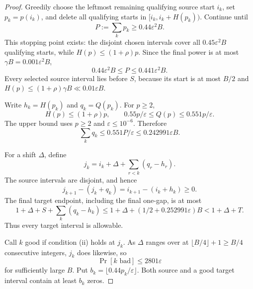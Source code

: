 \documentclass[11pt]{article}
\theoremstyle{remark}
\newcommand{\eps}{\varepsilon}
\begin{document}
\begin{proof}
Greedily choose the leftmost remaining qualifying source start $i_k$, set
$p_k=p(i_k)$, and delete all qualifying starts in
$[i_k,i_k+H(p_k))$.  Continue until
\[
 P:=\sum_kp_k\ge0.44\eps^2B.
\]
This stopping point exists: the disjoint chosen intervals cover all
$0.45\eps^2B$ qualifying starts, while
$H(p)\le(1+\rho)p$.  Since the final power is at most
$\gamma B=0.001\eps^2B$,
\begin{equation}\label{eq:P-range}
 0.44\eps^2B\le P\le0.441\eps^2B.
\end{equation}
Every selected source interval lies before $S$, because its start is at most
$B/2$ and $H(p)\le(1+\rho)\gamma B\ll0.01\eps B$.

Write $h_k=H(p_k)$ and $q_k=Q(p_k)$.  For $p\ge2$,
\begin{equation}\label{eq:Q-bound}
 H(p)\le(1+\rho)p,
 \qquad
 0.55p/\eps\le Q(p)\le0.551p/\eps.
\end{equation}
The upper bound uses $p\ge2$ and $\eps\le10^{-6}$.  Therefore
\begin{equation}\label{eq:Qsum}
 \sum_kq_k\le0.551P/\eps\le0.242991\eps B.
\end{equation}

For a shift $\Delta$, define
\begin{equation}\label{eq:j-k}
 j_k=i_k+\Delta+\sum_{r<k}(q_r-h_r).
\end{equation}
The source intervals are disjoint, and hence
\[
 j_{k+1}-(j_k+q_k)=i_{k+1}-(i_k+h_k)\ge0.
\]
The final target endpoint, including the final one-gap, is at most
\[
 1+\Delta+S+\sum_k(q_k-h_k)
 \le1+\Delta+(1/2+0.252991\eps)B
 <1+\Delta+T.
\]
Thus every target interval is allowable.

Call $k$ good if condition (ii) holds at $j_k$.  As $\Delta$ ranges over at
$\lfloor B/4\rfloor+1\ge B/4$ consecutive integers, $j_k$ does likewise, so
\begin{equation}\label{eq:bad-prob}
 \Pr[k\text{ bad}]\le2801\eps
\end{equation}
for sufficiently large $B$.  Put
$b_k=\lfloor0.44p_k/\eps\rfloor$.  Both source and a good target interval
contain at least $b_k$ zeros.


\end{proof}
\end{document}
